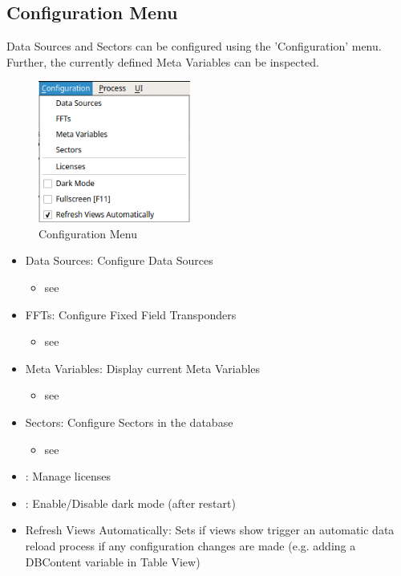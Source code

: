 \subsection{Configuration Menu}
\label{sec:ui_overview_config_menu}

Data Sources and Sectors can be configured using the 'Configuration' menu. Further, the currently defined Meta Variables can be inspected.

\begin{figure}[H]
  \center
    \includegraphics[width=5cm,frame]{figures/ui_configuration_menu.png}
  \caption{Configuration Menu}
\end{figure}

\begin{itemize}
 \item Data Sources: Configure Data Sources
  \begin{itemize}
   \item see 
  \end{itemize}
 \item FFTs: Configure Fixed Field Transponders
  \begin{itemize}
   \item see 
  \end{itemize}
 \item Meta Variables: Display current Meta Variables
  \begin{itemize}
   \item see 
  \end{itemize}
 \item Sectors: Configure Sectors in the database
  \begin{itemize}
   \item see 
  \end{itemize}
 \item {}: Manage licenses
 \item {}: Enable/Disable dark mode (after restart)
 \item Refresh Views Automatically: Sets if views show trigger an automatic data reload process if any configuration changes are made (e.g. adding a DBContent variable in Table View)
\end{itemize}
\  \\ 

